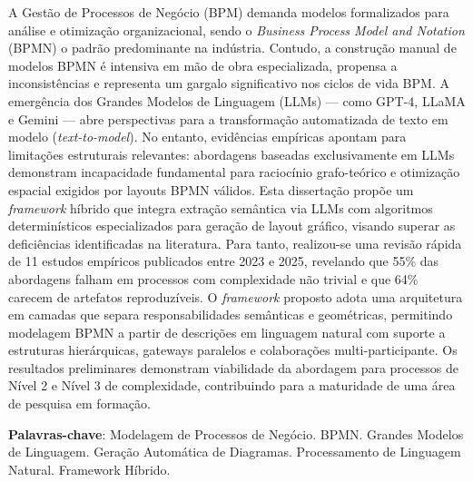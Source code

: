 \begin{resumo}

A Gestão de Processos de Negócio (BPM) demanda modelos formalizados
  para análise e otimização organizacional, sendo o \textit{Business
  Process Model and Notation} (BPMN) o padrão predominante na indústria.
  Contudo, a construção manual de modelos BPMN é intensiva em mão de
  obra especializada, propensa a inconsistências e representa um
  gargalo significativo nos ciclos de vida BPM. A emergência dos
  Grandes Modelos de Linguagem (LLMs) — como GPT-4, LLaMA e Gemini
  --- abre perspectivas para a transformação automatizada de texto
  em modelo (\textit{text-to-model}). No entanto, evidências empíricas
  apontam para limitações estruturais relevantes: abordagens baseadas
  exclusivamente em LLMs demonstram incapacidade fundamental para
  raciocínio grafo-teórico e otimização espacial exigidos por layouts
  BPMN válidos. Esta dissertação propõe um \textit{framework} híbrido
  que integra extração semântica via LLMs com algoritmos determinísticos
  especializados para geração de layout gráfico, visando superar as
  deficiências identificadas na literatura. Para tanto, realizou-se
  uma revisão rápida de 11 estudos empíricos publicados entre 2023 e
  2025, revelando que 55\% das abordagens falham em processos com
  complexidade não trivial e que 64\% carecem de artefatos reproduzíveis.
  O \textit{framework} proposto adota uma arquitetura em camadas que
  separa responsabilidades semânticas e geométricas, permitindo
  modelagem BPMN a partir de descrições em linguagem natural com
  suporte a estruturas hierárquicas, gateways paralelos e
  colaborações multi-participante. Os resultados preliminares
  demonstram viabilidade da abordagem para processos de Nível 2
  e Nível 3 de complexidade, contribuindo para a maturidade de
  uma área de pesquisa em formação.

{\hspace{-8mm} \bf{Palavras-chave}}: Modelagem de Processos de Negócio.
  BPMN. Grandes Modelos de Linguagem. Geração Automática de Diagramas.
  Processamento de Linguagem Natural. Framework Híbrido.

\end{resumo}

